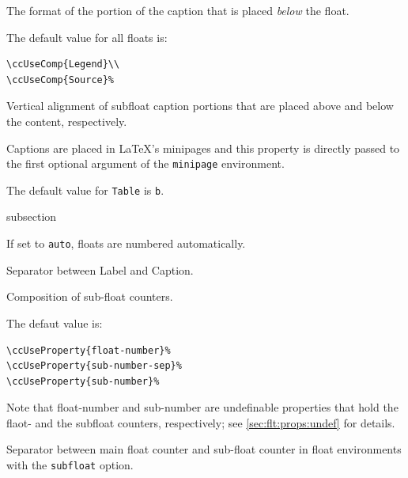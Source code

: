 
The format of the portion of the caption that is placed \textit{below}
the float.

The default value for all floats is:
\begin{lstlisting}[style=tex]
\ccUseComp{Legend}\\
\ccUseComp{Source}%
\end{lstlisting}


Vertical alignment of subfloat caption portions that are placed above
and below the content, respectively.

Captions are placed in \LaTeX's minipages and this property is directly
passed to the first optional argument of the \lstinline{minipage}
environment.

The default value for \lstinline{Table} is \lstinline{b}.


\begin{Heading}[label=sec:flt:numbering]{subsection}
\end{Heading}


If set to \lstinline{auto}, floats are numbered automatically.


Separator between Label and Caption.


Composition of sub-float counters.

The defaut value is:
\begin{lstlisting}[style=tex]
\ccUseProperty{float-number}%
\ccUseProperty{sub-number-sep}%
\ccUseProperty{sub-number}%
\end{lstlisting}
Note that float-number and sub-number are undefinable properties that hold the flaot- and the subfloat counters, respectively; see \autoref{sec:flt:props:undef} for details.


Separator between main float counter and sub-float counter in float
environments with the \lstinline{subfloat} option.

